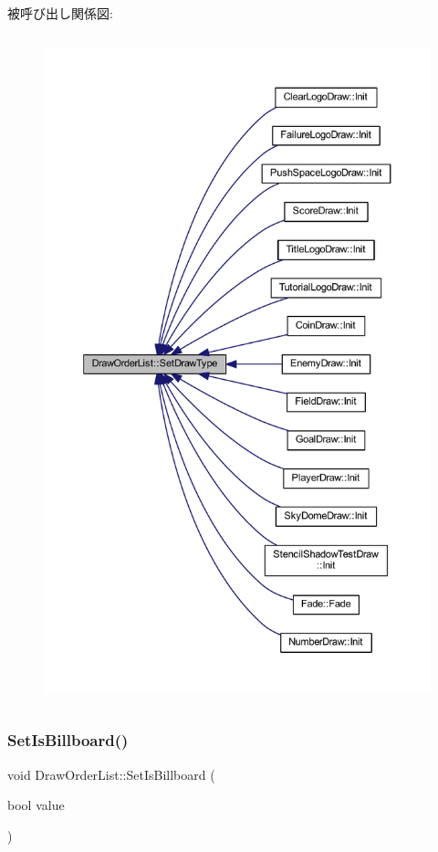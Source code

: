 被呼び出し関係図\+:\nopagebreak
\begin{figure}[H]
\begin{center}
\leavevmode
\includegraphics[height=550pt]{class_draw_order_list_a5b3ff99f9297293edc057b95d23e8f2d_icgraph}
\end{center}
\end{figure}
\mbox{\label{class_draw_order_list_abfb13518e5747d3faa351ca64ec676b2}} 
\subsubsection{\texorpdfstring{Set\+Is\+Billboard()}{SetIsBillboard()}}
{\footnotesize\ttfamily void Draw\+Order\+List\+::\+Set\+Is\+Billboard (\begin{DoxyParamCaption}\item[{bool}]{value }\end{DoxyParamCaption})\hspace{0.3cm}{\ttfamily [inline]}}



